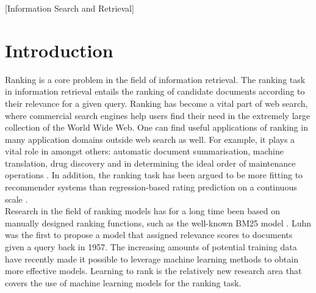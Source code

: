 \documentclass{sig-alternate}
\begin{document}
\maketitle

\begin{abstract}
Learning to rank is an increasingly important scientific field that comprises the use of machine learning for the ranking task. This research proposal proposes a two-stage research project in the learning to rank field. In the first research stage we will conduct a comparison of learning to rank methods over multiple benchmark collections. This is relevant, as a lack of a \emph{de facto} standard benchmark collection for evaluation of new learning to rank methods hinders comparison. The second stage analyses the potential speed-up gain of parallel execution of the most accurate learning to rank methods identified in the first research step through execution on Hadoop MapReduce. Research on scalability of learning to rank methods is widely seen as relevant and often overlooked \cite{Chapelle2011b, Liu2007}.
\end{abstract}
[Information Search and Retrieval]
%


\section{Introduction}
Ranking is a core problem in the field of information retrieval. The ranking task in information retrieval entails the ranking of candidate documents according to their relevance for a given query. Ranking has become a vital part of web search, where commercial search engines help users find their need in the extremely large collection of the World Wide Web. One can find useful applications of ranking in many application domains outside web search as well. For example, it plays a vital role in amongst others: automatic document summarisation, machine translation, drug discovery and in determining the ideal order of maintenance operations \cite{Rudin2009}. In addition, the ranking task has been argued to be more fitting to recommender systems than regression-based rating prediction on a continuous scale \cite{Adomavicius2005,McNee2006}.\\

Research in the field of ranking models has for a long time been based on manually designed ranking functions, such as the well-known BM25 model \cite{Robertson1994}. Luhn \cite{Luhn1957} was the first to propose a model that assigned relevance scores to documents given a query back in 1957. The increasing amounts of potential training data have recently made it possible to leverage machine learning methods to obtain more effective models. Learning to rank is the relatively new research area that covers the use of machine learning models for the ranking task.\\
\end{document}
